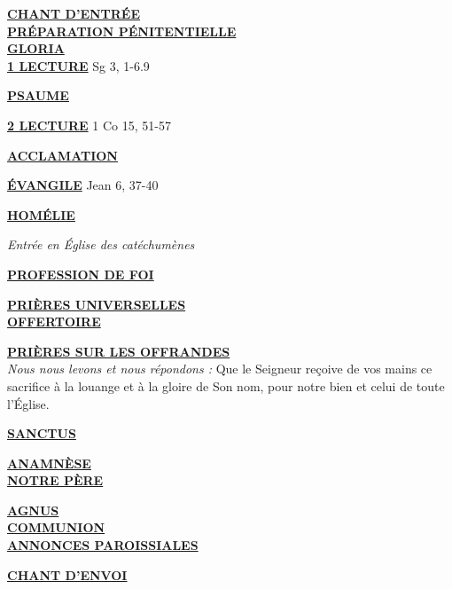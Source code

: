 \documentclass[french,11pt]{article}
\newcommand*{\chants}{../chants}
\newcommand*{\messe}{../messe_du_peuple_de_dieu}
\newcommand*{\pu}{../pu}
\newcommand*{\psaumes}{../psaumes}
\newcommand{\NewsItem}[1]{%
\vspace{3pt}
\underline{\textbf{#1}}
		  }
\begin{document}
\NewsItem{CHANT D'ENTRÉE}\\
	

\NewsItem{PRÉPARATION PÉNITENTIELLE}\\
	

\NewsItem{GLORIA}\\
	


\NewsItem{1\iere{} LECTURE} Sg 3, 1-6.9

\NewsItem{PSAUME}


\NewsItem{2\ieme{} LECTURE} 1 Co 15, 51-57

\NewsItem{ACCLAMATION}


\NewsItem{ÉVANGILE} Jean 6, 37-40

\NewsItem{HOMÉLIE}

\emph{Entrée en Église des catéchumènes}

\NewsItem{PROFESSION DE FOI}


\NewsItem{PRIÈRES UNIVERSELLES}\\

%
%
%
%

\NewsItem{OFFERTOIRE}

\NewsItem{PRIÈRES SUR LES OFFRANDES}\\
\textit{Nous nous levons et nous répondons : }
Que le Seigneur reçoive de vos mains ce sacrifice à la louange et à la gloire
de Son nom, pour notre bien et celui de toute l’Église.


\NewsItem{SANCTUS}


\NewsItem{ANAMNÈSE}\\


\NewsItem{NOTRE PÈRE}

\NewsItem{AGNUS} \\


\NewsItem{COMMUNION}\\ 


\NewsItem{ANNONCES PAROISSIALES}


\NewsItem{CHANT D'ENVOI}\\

\end{document}
